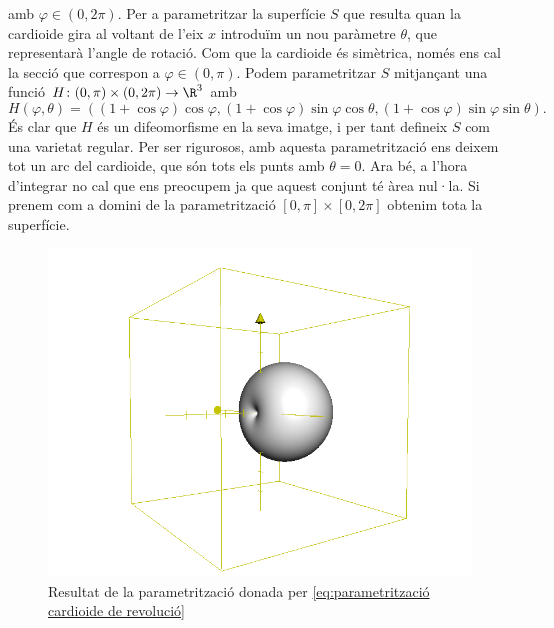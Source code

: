 \documentclass[12pt, a4paper]{article}
\begin{document}
amb \( \varphi \in (0, 2\pi) \). Per a parametritzar la superfície \( S \) que resulta quan la cardioide gira al voltant de l'eix \( x \) introduïm un nou paràmetre \( \theta \), que representarà l'angle de rotació. Com que la cardioide és simètrica, només ens cal la secció que correspon a \( \varphi \in (0, \pi) \). Podem parametritzar \( S \) mitjançant una funció \( H\colon (0,\pi) \times (0,2\pi) \to \R^3 \) amb 
\begin{equation}
  H(\varphi,\theta) = ((1+\cos{\varphi})\cos{\varphi}, (1+\cos{\varphi})\sin{\varphi}\cos{\theta}, (1+\cos{\varphi})\sin{\varphi}\sin{\theta}). \label{eq:cardioide de revolució}
\end{equation}
És clar que \( H \) és un difeomorfisme en la seva imatge, i per tant defineix \( S \) com una varietat regular. Per ser rigurosos, amb aquesta parametrització ens deixem tot un arc del cardioide, que són tots els punts amb \( \theta = 0 \). Ara bé, a l'hora d'integrar no cal que ens preocupem ja que aquest conjunt té àrea nul·la. Si prenem com a domini de la parametrització \( [0,\pi] \times [0,2\pi] \)	obtenim tota la superfície.

\begin{figure}[htb]
  \centering
  \includegraphics[scale = 0.4]{cardioide.jpg}
 	\caption{Resultat de la parametrització donada per \ref{eq:parametrització cardioide de revolució}} 
\end{figure}
\end{document}
